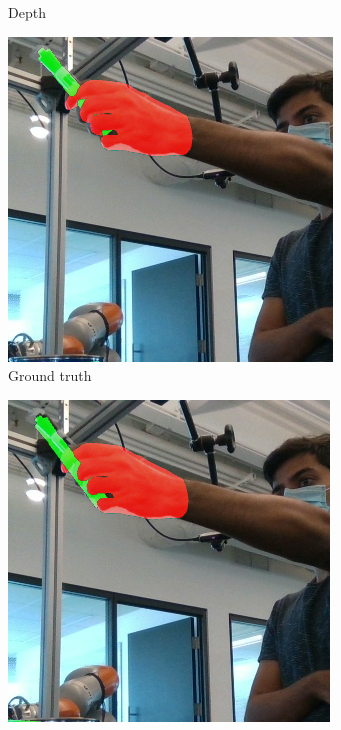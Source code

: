 \begin{figure}[h!]
\begin{subfigure}[b]{0.16\linewidth}
    \caption{Depth}
  \end{subfigure}
  \begin{subfigure}[b]{0.16\linewidth}
    \includegraphics[width=0.98\linewidth]{figs/180000_4}
    \caption{Ground truth}
  \end{subfigure}
  \begin{subfigure}[b]{0.16\linewidth}
    \includegraphics[width=0.98\linewidth]{figs/180000_8}

\end{subfigure}
\end{figure}
